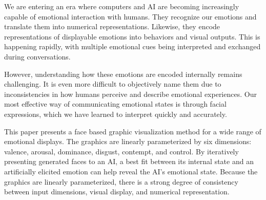 We are entering an era where computers and AI are becoming increasingly capable
of emotional interaction with humans.
They recognize our emotions and translate them into numerical representations.
Likewise, they encode representations of displayable emotions into behaviors and visual outputs.
This is happening rapidly, with multiple emotional cues being interpreted and exchanged during conversations.

However, understanding how these emotions are encoded internally remains challenging.
It is even more difficult to objectively name them due to inconsistencies in how humans
perceive and describe emotional experiences. Our most effective way of communicating
emotional states is through facial expressions, which we have learned to interpret quickly and accurately.

This paper presents a face based graphic visualization method for a wide range of emotional displays.
The graphics are linearly parameterized by six dimensions:
valence, arousal, dominance, disgust, contempt, and control.
By iteratively presenting generated faces to an AI, a best fit between its
internal state and an artificially elicited emotion can help reveal the AI's emotional state.
Because the graphics are linearly parameterized, there is a strong degree of
consistency between input dimensions, visual display, and numerical representation.